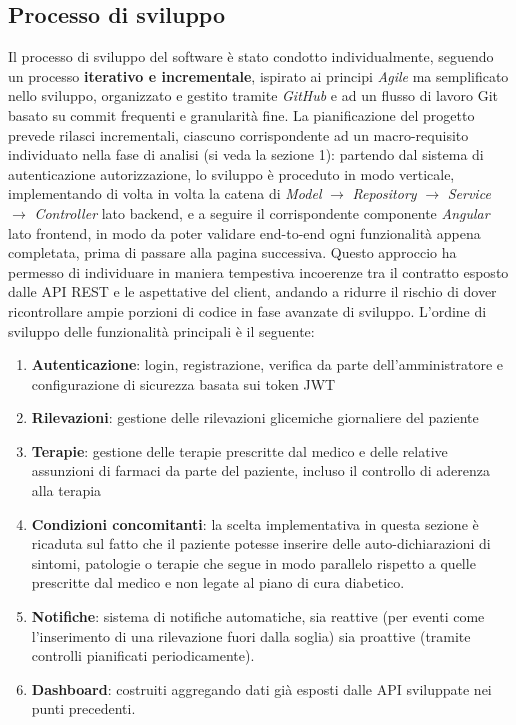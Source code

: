 \documentclass{article}
\begin{document}
\subsection{Processo di sviluppo}
Il processo di sviluppo del software è stato condotto individualmente, seguendo un processo
\textbf{iterativo e incrementale}, ispirato ai principi \textit{Agile} ma semplificato nello
sviluppo, organizzato e gestito tramite \textit{GitHub} e ad un flusso di lavoro Git basato
su commit frequenti e granularità fine.
\vspace{1em}
\noindent
\newline
La pianificazione del progetto prevede rilasci incrementali, ciascuno corrispondente
ad un macro-requisito individuato nella fase di analisi (si veda la sezione 1): partendo dal sistema
di autenticazione autorizzazione, lo sviluppo è proceduto in modo verticale, implementando
di volta in volta la catena di \textit{Model} \( \rightarrow \) \textit{Repository} \( \rightarrow \) \textit{Service} \( \rightarrow \) \textit{Controller}
lato backend, e a seguire il corrispondente componente \textit{Angular} lato frontend, in modo da poter validare
end-to-end ogni funzionalità appena completata, prima di passare alla pagina successiva.
Questo approccio ha permesso di individuare in maniera tempestiva incoerenze tra il contratto esposto
dalle API REST e le aspettative del client, andando a ridurre il rischio di dover ricontrollare ampie porzioni di codice in
fase avanzate di sviluppo.
\vspace{1em}
\noindent
\newline
L'ordine di sviluppo delle funzionalità principali è il seguente:
\begin{enumerate}
   \item \textbf{Autenticazione}: login, registrazione, verifica da parte dell'amministratore e configurazione di sicurezza basata sui token JWT
   \item \textbf{Rilevazioni}: gestione delle rilevazioni glicemiche giornaliere del paziente
   \item \textbf{Terapie}: gestione delle terapie prescritte dal medico e delle relative assunzioni di farmaci da parte del paziente, incluso il controllo di aderenza alla terapia
   \item \textbf{Condizioni concomitanti}: la scelta implementativa in questa sezione è ricaduta sul fatto che il paziente potesse inserire delle auto-dichiarazioni di sintomi, patologie o terapie che segue in modo parallelo rispetto a quelle prescritte dal medico e non legate al piano di cura diabetico.
   \item \textbf{Notifiche}: sistema di notifiche automatiche, sia reattive (per eventi come l'inserimento di una rilevazione fuori dalla soglia) sia proattive (tramite controlli pianificati periodicamente).
   \item \textbf{Dashboard}: costruiti aggregando dati già esposti dalle API sviluppate nei punti precedenti.
\end{enumerate}
\end{document}
